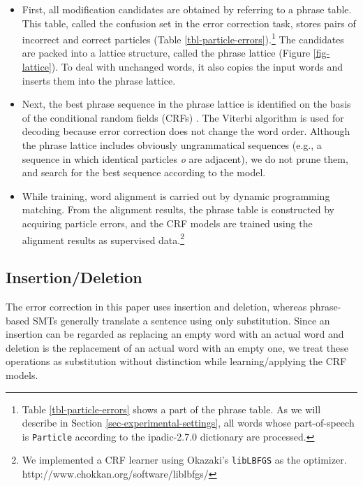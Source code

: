 \documentclass[english]{jnlp_1.4_rep}
\begin{document}
\begin{itemize}

\item First, all modification candidates are obtained by referring to
a phrase table. This table, called the confusion set
 in the error correction task,
stores pairs of incorrect and correct particles (Table
\ref{tbl-particle-errors}).\footnote{Table \ref{tbl-particle-errors}
shows a part of the phrase table. As we will describe in Section
\ref{sec-experimental-settings}, all words whose part-of-speech is
\texttt{Particle} according to the ipadic-2.7.0 dictionary are
processed.}  The candidates are packed into a lattice structure,
called the phrase lattice (Figure \ref{fig-lattice}).  To deal with
unchanged words, it also copies the input words and inserts them into
the phrase lattice.

\item Next, the best phrase sequence in the phrase lattice is
identified on the basis of the conditional random fields (CRFs)
\cite{Lafferty:CRF2001}. The Viterbi algorithm is used for
decoding because error correction does not change the word
order. Although the phrase lattice includes obviously ungrammatical
sequences (e.g., a sequence in which identical particles \textit{o}
are adjacent), we do not prune them, and search for the best sequence
according to the model.

\item While training, word alignment is carried out by dynamic
programming matching. From the alignment results, the phrase table is
constructed by acquiring particle errors, and the CRF models are
trained using the alignment results as supervised data.\footnote{We
implemented a CRF learner using Okazaki's \texttt{libLBFGS} as the
optimizer.\\ http://www.chokkan.org/software/liblbfgs/}

\end{itemize}


\subsection{Insertion/Deletion}

The error correction in this paper uses insertion and deletion,
whereas phrase-based SMTs generally translate a sentence using only
substitution. Since an insertion can be regarded as replacing an empty
word with an actual word and deletion is the replacement of an actual
word with an empty one, we treat these operations as substitution
without distinction while learning/applying the CRF models.
\end{document}
